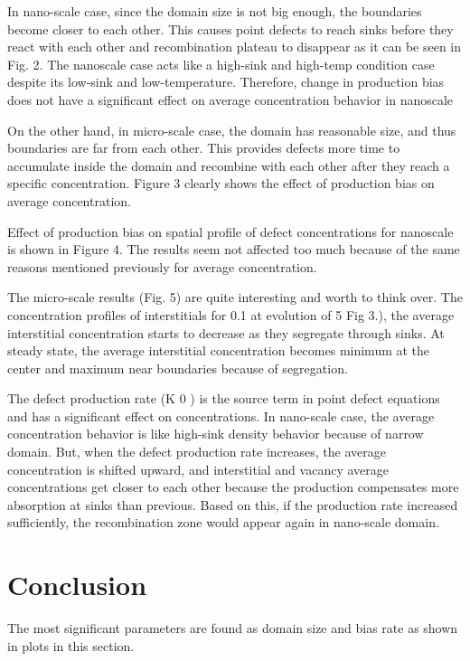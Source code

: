 \documentclass[a4paper]{article}
\begin{document}
In nano-scale case, since the domain size is not big enough, the boundaries become
closer to each other. This causes point defects to reach sinks before they react with each other
and recombination plateau to disappear as it can be seen in Fig. 2. The nanoscale case acts like
a high-sink and high-temp condition case despite its low-sink and low-temperature. Therefore,
change in production bias does not have a significant effect on average concentration behavior
in nanoscale

On the other hand, in micro-scale case, the domain has reasonable size, and thus
boundaries are far from each other. This provides defects more time to accumulate inside the
domain and recombine with each other after they reach a specific concentration. Figure 3
clearly shows the effect of production bias on average concentration.

Effect of production bias on spatial profile of defect concentrations for nanoscale is
shown in Figure 4. The results seem not affected too much because of the same reasons
mentioned previously for average concentration.

The micro-scale results (Fig. 5) are quite interesting and worth to think over. The
concentration profiles of interstitials for 0.1%
at evolution of 5%
Fig 3.), the average interstitial concentration starts to decrease as they segregate through sinks.
At steady state, the average interstitial concentration becomes minimum at the center and
maximum near boundaries because of segregation.

The defect production rate (K 0 ) is the source term in point defect equations and has a
significant effect on concentrations.
In nano-scale case, the average concentration behavior is like high-sink density behavior
because of narrow domain. But, when the defect production rate increases, the average
concentration is shifted upward, and interstitial and vacancy average concentrations get closer
to each other because the production compensates more absorption at sinks than previous.
Based on this, if the production rate increased sufficiently, the recombination zone would
appear again in nano-scale domain.\cite{was2016}

\section{Conclusion} \hspace{10pt}

The most significant parameters are found as domain size and bias rate as shown in plots in this section.



\end{document}
